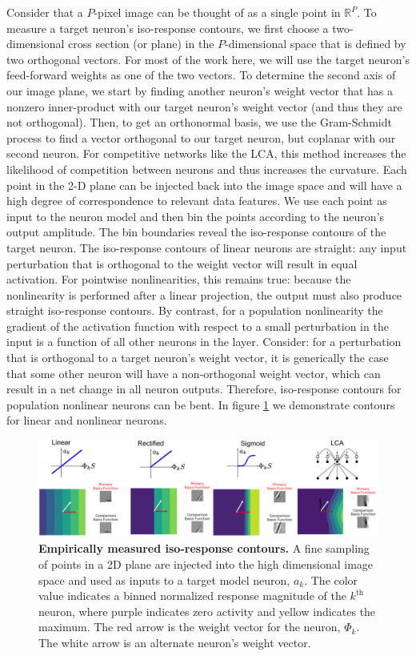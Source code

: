 Consider that a $P$-pixel image can be thought of as a single point in $\mathbb{R}^{P}$.
To measure a target neuron's iso-response contours, we first choose a two-dimensional cross section (or plane) in the $P$-dimensional space that is defined by two orthogonal vectors.
For most of the work here, we will use the target neuron's feed-forward weights as one of the two vectors.
To determine the second axis of our image plane, we start by finding another neuron's weight vector that has a nonzero inner-product with our target neuron's weight vector (and thus they are not orthogonal).
Then, to get an orthonormal basis, we use the Gram-Schmidt process to find a vector orthogonal to our target neuron, but coplanar with our second neuron.
For competitive networks like the LCA, this method increases the likelihood of competition between neurons and thus increases the curvature. 
Each point in the 2-D plane can be injected back into the image space and will have a high degree of correspondence to relevant data features.
We use each point as input to the neuron model and then bin the points according to the neuron's output amplitude.
The bin boundaries reveal the iso-response contours of the target neuron.
The iso-response contours of linear neurons are straight: any input perturbation that is orthogonal to the weight vector will result in equal activation.
For pointwise nonlinearities, this remains true: because the nonlinearity is performed after a linear projection, the output must also produce straight iso-response contours.
By contrast, for a population nonlinearity the gradient of the activation function with respect to a small perturbation in the input is a function of all other neurons in the layer.
Consider: for a perturbation that is orthogonal to a target neuron's weight vector, it is generically the case that some other neuron will have a non-orthogonal weight vector, which can result in a net change in all neuron outputs.
Therefore, iso-response contours for population nonlinear neurons can be bent.
In figure \ref{fig:ch4_iso_contours} we demonstrate contours for linear and nonlinear neurons.

\begin{figure}[h]
    \centering
    \includegraphics[width=\textwidth]{figures/iso_contour_comparison.png}
    \caption{\textbf{Empirically measured iso-response contours.} A fine sampling of points in a 2D plane are injected into the high dimensional image space and used as inputs to a target model neuron, $a_{k}$. The color value indicates a binned normalized response magnitude of the $k^{\text{th}}$ neuron, where purple indicates zero activity and yellow indicates the maximum. The red arrow is the weight vector for the neuron, $\Phi_{k}$. The white arrow is an alternate neuron's weight vector.}
    \label{fig:ch4_iso_contours}
\end{figure}


